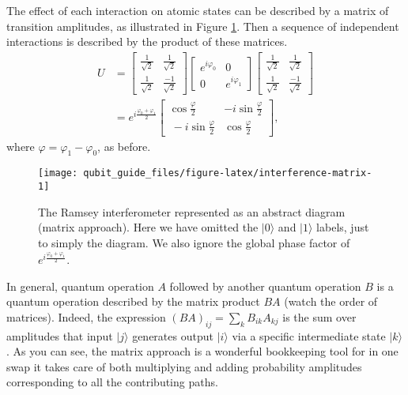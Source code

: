 \documentclass[fleqn]{article}
\begin{document}
The effect of each interaction on atomic states can be described by a matrix of transition amplitudes, as illustrated in Figure \ref{fig:interference-matrix}.
Then a sequence of independent interactions is described by the product of these matrices.
\[
  \begin{aligned}
    U &=
    \begin{bmatrix}
      \frac{1}{\sqrt2} & \frac{1}{\sqrt2}
    \\\frac{1}{\sqrt2} & \frac{-1}{\sqrt2}
    \end{bmatrix}
    \begin{bmatrix}
      e^{i\varphi_0} & 0
    \\0 & e^{i\varphi_1}
    \end{bmatrix}
    \begin{bmatrix}
      \frac{1}{\sqrt2} & \frac{1}{\sqrt2}
    \\\frac{1}{\sqrt2} & \frac{-1}{\sqrt2}
    \end{bmatrix}
  \\&= e^{i\frac{\varphi_0+\varphi_1}{2}}
    \begin{bmatrix}
      \cos\frac{\varphi}{2} & -i\sin\frac{\varphi}{2}
    \\\ -i\sin\frac{\varphi}{2}& \cos\frac{\varphi}{2}
    \end{bmatrix},
  \end{aligned}
\]
where \(\varphi = \varphi_1-\varphi_0\), as before.



\begin{figure}[H]

{\centering \texttt{[image: qubit\_guide\_files/figure-latex/interference-matrix-1]} 

}

\caption{The Ramsey interferometer represented as an abstract diagram (matrix approach). Here we have omitted the \(|0\rangle\) and \(|1\rangle\) labels, just to simply the diagram. We also ignore the global phase factor of \(e^{i\frac{\varphi_0+\varphi_1}{2}}\).}\label{fig:interference-matrix}
\end{figure}

In general, quantum operation \(A\) followed by another quantum operation \(B\) is a quantum operation described by the matrix product \(BA\) (watch the order of matrices).
Indeed, the expression \((BA)_{ij}=\sum_k B_{ik}A_{kj}\) is the sum over amplitudes that input \(|j\rangle\) generates output \(|i\rangle\) via a specific intermediate state \(|k\rangle\).
As you can see, the matrix approach is a wonderful bookkeeping tool for in one swap it takes care of both multiplying and adding probability amplitudes corresponding to all the contributing paths.
\end{document}

